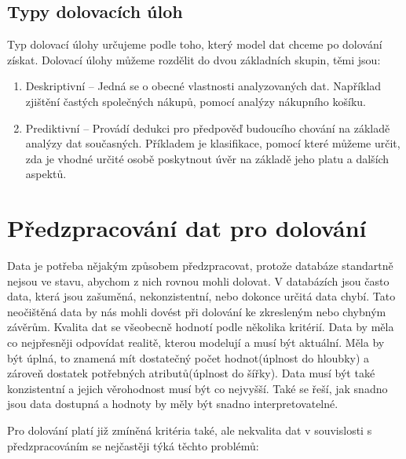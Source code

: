 \subsection*{Typy dolovacích úloh}
Typ dolovací úlohy určujeme podle toho, který model dat chceme po dolování získat. Dolovací úlohy můžeme rozdělit do dvou základních skupin, těmi jsou: \cite[Kapitola~1]{Kamber}

\begin{enumerate}
  \item{Deskriptivní – Jedná se o obecné vlastnosti analyzovaných dat. Například zjištění častých společných nákupů, pomocí analýzy nákupního košíku.}
  \item{Prediktivní – Provádí dedukci pro předpověď budoucího chování na základě analýzy dat současných. Příkladem je klasifikace, pomocí které můžeme určit, zda je vhodné určité osobě poskytnout úvěr na základě jeho platu a dalších aspektů.}

\end{enumerate}

\section{Předzpracování dat pro dolování}
Data je potřeba nějakým způsobem předzpracovat, protože databáze standartně nejsou ve stavu, abychom z nich rovnou mohli dolovat. V databázích jsou často data, která jsou zašuměná, nekonzistentní, nebo dokonce určitá data chybí. Tato neočištěná data by nás mohli dovést při dolování ke zkresleným nebo chybným závěrům.
Kvalita dat se všeobecně hodnotí podle několika kritérií. Data by měla co nejpřesněji odpovídat realitě, kterou modelují a musí být aktuální. Měla by být úplná, to znamená mít dostatečný počet hodnot(úplnost do hloubky) a zároveň dostatek potřebných atributů(úplnost do šířky). Data musí být také konzistentní a jejich věrohodnost musí být co nejvyšší. Také se řeší, jak snadno jsou data dostupná a hodnoty by měly být snadno interpretovatelné. \cite[Kapitola~3]{Kamber} 


Pro dolování platí již zmíněná kritéria také, ale nekvalita dat v souvislosti s předzpracováním se nejčastěji týká těchto problémů: \cite[Kapitola~3]{Kamber}


